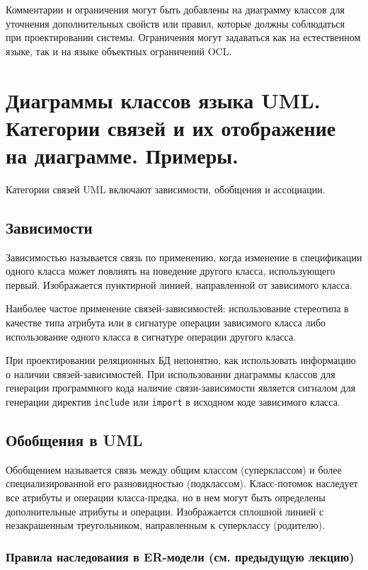 \documentclass[a4paper,12pt]{article}
\begin{document}
Комментарии и ограничения могут быть добавлены на диаграмму классов для уточнения дополнительных свойств или правил, которые должны соблюдаться при проектировании системы. Ограничения могут задаваться как на естественном языке, так и на языке объектных ограничений OCL.

\section{Диаграммы классов языка UML. Категории связей и их отображение на диаграмме. Примеры.}

Категории связей UML включают зависимости, обобщения и ассоциации.

\subsection{Зависимости}

Зависимостью называется связь по применению, когда изменение в спецификации одного класса может повлиять на поведение другого класса, использующего первый. Изображается пунктирной линией, направленной от зависимого класса.

Наиболее частое применение связей-зависимостей: использование стереотипа в качестве типа атрибута или в сигнатуре операции зависимого класса либо использование одного класса в сигнатуре операции другого класса.

При проектировании реляционных БД непонятно, как использовать информацию о наличии связей-зависимостей. При использовании диаграммы классов для генерации программного кода наличие связи-зависимости является сигналом для генерации директив \texttt{include} или \texttt{import} в исходном коде зависимого класса.

\subsection{Обобщения в UML}

Обобщением называется связь между общим классом (суперклассом) и более специализированной его разновидностью (подклассом). Класс-потомок наследует все атрибуты и операции класса-предка, но в нем могут быть определены дополнительные атрибуты и операции. Изображается сплошной линией с незакрашенным треугольником, направленным к суперклассу (родителю).

\subsubsection{Правила наследования в ER-модели (см. предыдущую лекцию)}
\end{document}
